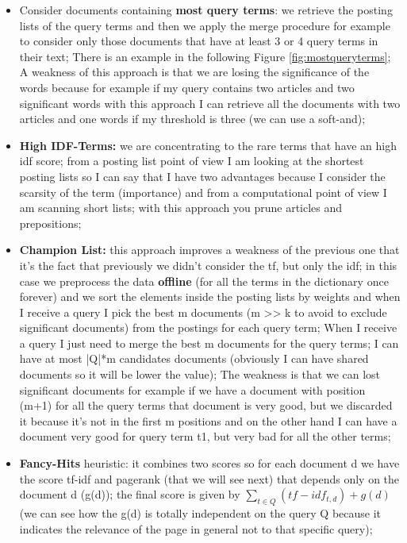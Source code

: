 \begin{itemize}
    \item Consider documents containing \textbf{most query terms}: we retrieve the posting lists of the query terms and then we apply the merge procedure for example to consider only those documents that have at least 3 or 4 query terms in their text; There is an example in the following Figure \ref{fig:mostqueryterms}; A weakness of this approach is that we are losing the significance of the words because for example if my query contains two articles and two significant words with this approach I can retrieve all the documents with two articles and one words if my threshold is three (we can use a soft-and);
    \item \textbf{High IDF-Terms:} we are concentrating to the rare terms that have an high idf score; from a posting list point of view I am looking at the shortest posting lists so I can say that I have two advantages because I consider the scarsity of the term (importance) and from a computational point of view I am scanning short lists; with this approach you prune articles and prepositions;
    \item \textbf{Champion List:} this approach improves a weakness of the previous one that it's the fact that previously we didn't consider the tf, but only the idf; in this case we preprocess the data \textbf{offline} (for all the terms in the dictionary once forever) and we sort the elements inside the posting lists by weights and when I receive a query I pick the best m documents (m >> k to avoid to exclude significant documents) from the postings for each query term; When I receive a query I just need to merge the best m documents for the query terms; I can have at most |Q|*m candidates documents (obviously I can have shared documents so it will be lower the value); The weakness is that we can lost significant documents for example if we have a document with position (m+1) for all the query terms that document is very good, but we discarded it because it's not in the first m positions and on the other hand I can have a document very good for query term t1, but very bad for all the other terms;
    \item \textbf{Fancy-Hits} heuristic: it combines two scores so for each document d we have the score tf-idf and pagerank (that we will see next) that depends only on the document d (g(d)); the final score is given by $\sum_{t \in Q}(tf-idf_{t,d})+g(d)$ (we can see how the g(d) is totally independent on the query Q because it indicates the relevance of the page in general not to that specific query);

\end{itemize}

